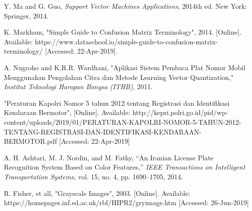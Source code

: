 \begin{thebibliography}{7}
{Y. Ma and G. Guo, \emph{Support Vector Machines Applications}, 2014th ed. New York: Springer, 2014.}

{K. Markham, "Simple Guide to Confusion Matrix Terminology", 2014. [Online]. Available: https://www.dataschool.io/simple-guide-to-confusion-matrix-terminology/ [Accessed: 22-Apr-2019].}

{A. Nugroho and K.R.R. Wardhani, "Aplikasi Sistem Pembaca Plat Nomor Mobil Menggunakan Pengolahan Citra dan Metode Learning Vector Quantization," \emph{Institut Teknologi Harapan Bangsa (ITHB)}, 2011.}

{"Peraturan Kapolri Nomor 5 tahun 2012 tentang Registrasi dan Identifikasi Kendaraan Bermotor", [Online]. Available: http://kepri.polri.go.id/pid/wp-content/uploads/2019/01/PERATURAN-KAPOLRI-NOMOR-5-TAHUN-2012-TENTANG-REGISTRASI-DAN-IDENTIFIKASI-KENDARAAN-BERMOTOR.pdf [Accessed: 22-Apr-2019]}

{A. H. Ashtari, M. J. Nordin, and M. Fathy, “An Iranian License Plate Recognition System Based on Color Features,” \emph{IEEE Transactions on Intelligent Transportation Systems}, vol. 15, no. 4, pp. 1690–1705, 2014.}

{R. Fisher, et all, "Grayscale Images", 2003. [Online]. Available: https://homepages.inf.ed.ac.uk/rbf/HIPR2/gryimage.htm [Accessed: 26-Jun-2019]}


\end{thebibliography}
